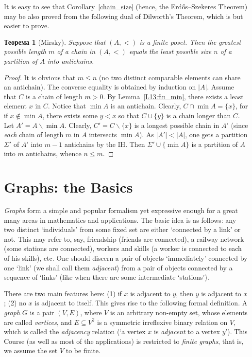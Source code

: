 \documentclass[12pt,notitlepage]{article}
\theoremstyle{plain}
\newtheorem{thm}{Теорема}[section]
\theoremstyle{definition}
\theoremstyle{plain}
\newcommand{\sbs}{\subseteq}
\renewcommand{\setminus}{\smallsetminus}
\newcommand{\1}{\mathbf{1}}
\newcommand{\0}{\mathbf{0}}
\newcommand{\mcomm}[1]{}
\begin{document}
It is easy to see that Corollary~\ref{chain_size} (hence, the Erd\H{o}s--Szekeres Theorem) may be also proved from the following dual of Dilworth's Theorem, which is but easier to prove.

\begin{thm}[Mirsky]
	Suppose that $(A, <)$ is a finite poset. Then the greatest possible length $m$ of a chain in $(A, <)$ equals the least possible size $n$ of a partition of $A$ into antichains.
\end{thm}
\begin{proof}
	It is obvious that $m \leq n$ (no two distinct comparable elements can share an antichain). The converse equality is obtained by induction on $|A|$. Assume that $C$ is a chain of length $m > 0$. By Lemma~\ref{L13:fin_min}, there exists a least element $x$ in $C$. Notice that $\min A$ is an antichain. Clearly, $C \cap \min A = \{ x \}$, for if $x \notin \min A$, there exists some $y < x$ so that $C \cup \{y\}$ is a chain longer than $C$. Let $A' = A \setminus \min A$. Clearly, $C' = C \setminus \{x\}$ is a longest possible chain in $A'$ (since \emph{each} chain of length $m$ in $A$ intersects $\min A$). As $|A'| < |A|$, one gets a partition $\Sigma'$ of $A'$ into $m - 1$ antichains by the IH. Then $\Sigma' \cup \{ \min A \}$ is a partition of $A$ into $m$ antichains, whence $n \leq m$.
\end{proof}

\section{Graphs: the Basics}
\mcomm{Our treatment of graphs is brief and mostly traditional. We try to employ the previously developed formalism as much as it is reasonably possible.}

\emph{Graphs} form a simple and popular formalism yet expressive enough for a great many areas in mathematics and applications. The basic idea is as follows: any two distinct `individuals' from some fixed set are either `connected by a link' or not. This may refer to, say, friendship (friends are connected), a railway network (some stations are connected), workers and skills (a worker is connected to each of his skills), etc. One should discern a pair of objects `immediately' connected by one `link' (we shall call them \emph{adjacent}) from a pair of objects connected by a sequence of `links' (like when there are some intermediate `stations'). 

There are two main features here: (1) if $x$ is adjacent to $y$, then $y$ is adjacent to $x$; (2) no $x$ is adjacent to itself. This gives rise to the following formal definition. A \emph{graph} $G$ is a pair $(V, E)$, where $V$ is an arbitrary non-empty set, whose elements are called \emph{vertices}, and $E \sbs V^2$ is a symmetric irreflexive binary relation on $V$, which is called the \emph{adjacency} relation (`a vertex $x$ is \emph{adjacent} to a vertex $y$'). This Course (as well as most of the applications) is restricted to \emph{finite graphs}, that is, we assume the set $V$ to be finite.
\end{document}
